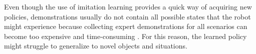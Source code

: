 Even though the use of imitation learning provides a quick way of acquiring new policies, demonstrations usually do not contain all possible states that the robot might experience because collecting expert demonstrations for all scenarios can become too expensive and time-consuming \cite{osa_algorithmic_2018}. For this reason, the learned policy might struggle to generalize to novel objects and situations.

